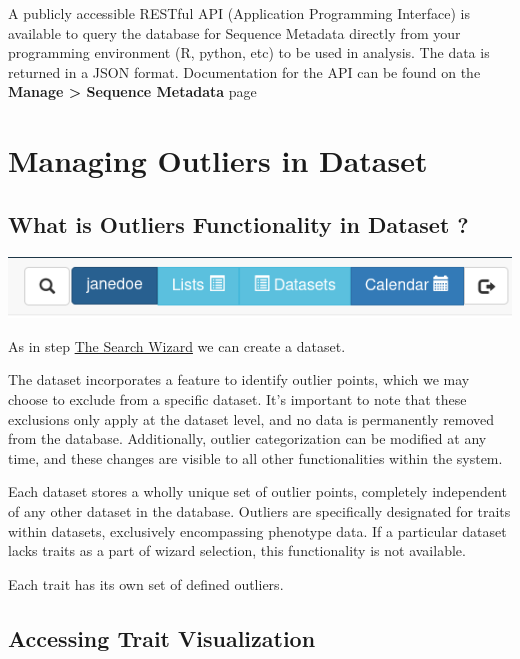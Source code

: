 \documentclass[
  12pt,
]{book}
\begin{document}
A publicly accessible RESTful API (Application Programming Interface) is available to query the database for Sequence Metadata directly from your programming environment (R, python, etc) to be used in analysis. The data is returned in a JSON format. Documentation for the API can be found on the \textbf{Manage \textgreater{} Sequence Metadata} page

\hypertarget{managing-outliers-in-dataset}{%
\chapter{Managing Outliers in Dataset}\label{managing-outliers-in-dataset}}

\hypertarget{what-is-outliers-functionality-in-dataset}{%
\section{What is Outliers Functionality in Dataset ?}\label{what-is-outliers-functionality-in-dataset}}

\begin{center}\includegraphics[width=0.95\linewidth]{assets/images/outliers_dataset_icon} \end{center}

As in step \protect\hyperlink{search-wizard}{The Search Wizard} we can create a dataset.

The dataset incorporates a feature to identify outlier points, which we may choose to exclude from a specific dataset. It's important to note that these exclusions only apply at the dataset level, and no data is permanently removed from the database. Additionally, outlier categorization can be modified at any time, and these changes are visible to all other functionalities within the system.

Each dataset stores a wholly unique set of outlier points, completely independent of any other dataset in the database. Outliers are specifically designated for traits within datasets, exclusively encompassing phenotype data. If a particular dataset lacks traits as a part of wizard selection, this functionality is not available.

Each trait has its own set of defined outliers.

\hypertarget{accessing-trait-visualization}{%
\section{Accessing Trait Visualization}\label{accessing-trait-visualization}}
\end{document}
